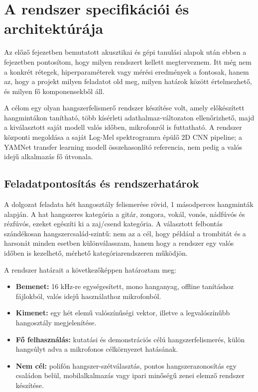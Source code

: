 \chapter{A rendszer specifikációi és architektúrája}
\label{chap:specifikacio}

Az előző fejezetben bemutatott akusztikai és gépi tanulási alapok után ebben a fejezetben pontosítom, hogy milyen rendszert kellett megterveznem. Itt még nem a konkrét rétegek, hiperparaméterek vagy mérési eredmények a fontosak, hanem az, hogy a projekt milyen feladatot old meg, milyen határok között értelmezhető, és milyen fő komponensekből áll.

A célom egy olyan hangszerfelismerő rendszer készítése volt, amely előkészített hangmintákon tanítható, több kísérleti adathalmaz-változaton ellenőrizhető, majd a kiválasztott saját modell valós időben, mikrofonról is futtatható. A rendszer központi megoldása a saját Log-Mel spektrogramra épülő 2D CNN pipeline; a YAMNet transfer learning modell összehasonlító referencia, nem pedig a valós idejű alkalmazás fő útvonala.

\section{Feladatpontosítás és rendszerhatárok}

A dolgozat feladata hét hangosztály felismerése rövid, 1 másodperces hangminták alapján. A hat hangszeres kategória a gitár, zongora, vokál, vonós, nádfúvós és rézfúvós, ezeket egészíti ki a zaj/csend kategória. A választott felbontás szándékosan hangszercsalád-szintű: nem az a cél, hogy például a trombitát és a harsonát minden esetben különválasszam, hanem hogy a rendszer egy valós időben is kezelhető, mérhető kategóriarendszeren működjön.

A rendszer határait a következőképpen határoztam meg:
\begin{itemize}
  \item \textbf{Bemenet:} 16 kHz-re egységesített, mono hanganyag, offline tanításhoz fájlokból, valós idejű használathoz mikrofonból.
  \item \textbf{Kimenet:} egy hét elemű valószínűségi vektor, illetve a legvalószínűbb hangosztály megjelenítése.
  \item \textbf{Fő felhasználás:} kutatási és demonstrációs célú hangszerfelismerés, külön hangsúlyt adva a mikrofonos célkörnyezet hatásának.
  \item \textbf{Nem cél:} polifón hangszer-szétválasztás, pontos hangszerazonosítás egy családon belül, mobilalkalmazás vagy ipari minőségű zenei elemző rendszer készítése.
\end{itemize}

